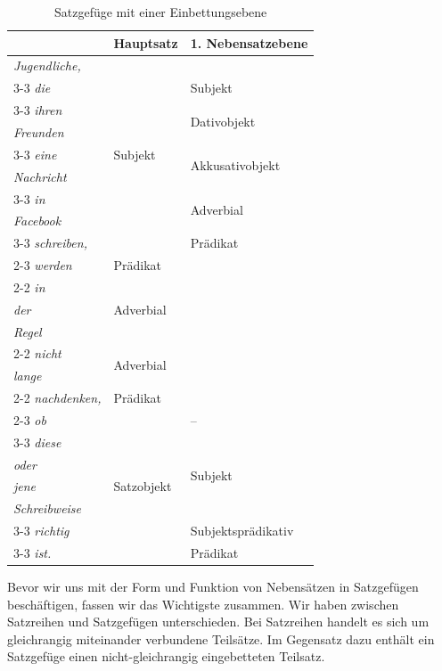 \begin{table}
  \centering
  \begin{tabular}{l|l|l}
      &  Hauptsatz & 1. Nebensatzebene \\
    \hline
    \textit{Jugendliche,} & \multirow{9}{*}{Subjekt} &  \\
    \cline{3-3} 
    \textit{die} & & Subjekt \\
    \cline{3-3}
    \textit{ihren} & & \multirow{2}{*}{Dativobjekt} \\ 
    \textit{Freunden} &  & \\ \cline{3-3}
    \textit{eine} & &  \multirow{2}{*}{Akkusativobjekt} \\ 
    \textit{Nachricht} & & \\ \cline{3-3}
    \textit{in} & & \multirow{2}{*}{Adverbial} \\ 
    \textit{Facebook} & & \\ \cline{3-3}
    \textit{schreiben,} & & Prädikat \\ \cline{2-3}
    \textit{werden} & Prädikat &  \\ \cline{2-2}
    \textit{in} & \multirow{3}{*}{Adverbial} & \\ 
    \textit{der} & & \\ 
    \textit{Regel} & & \\ \cline{2-2} 
    \textit{nicht} & \multirow{2}{*}{Adverbial} & \\ 
    \textit{lange} & & \\ \cline{2-2}
    \textit{nachdenken,} & Prädikat & \\ \cline{2-3}
    \textit{ob} & \multirow{7}{*}{Satzobjekt} & -- \\ \cline{3-3}
    \textit{diese} & & \multirow{4}{*}{Subjekt} \\
    \textit{oder} & & \\
    \textit{jene} & & \\ 
    \textit{Schreibweise} & & \\ \cline{3-3}
    \textit{richtig} & & Subjektsprädikativ \\ \cline{3-3}
    \textit{ist.} & & Prädikat \\ 
    \hline 
  \end{tabular}
  \caption{Satzgefüge mit einer Einbettungsebene}
  \label{tab:Satzgefüge2}
\end{table}

\vspace{.2cm}

Bevor wir uns mit der Form und Funktion von Nebensätzen in Satzgefügen beschäftigen, fassen wir das Wichtigste zusammen. Wir haben zwischen Satzreihen und Satzgefügen unterschieden. Bei Satzreihen handelt es sich um gleichrangig miteinander verbundene Teilsätze. Im Gegensatz dazu enthält ein Satzgefüge einen nicht-gleichrangig eingebetteten Teilsatz. 


